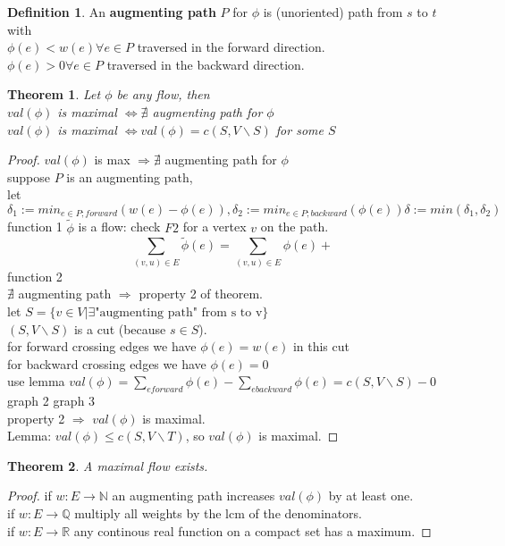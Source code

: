\documentclass{article}
\newtheorem*{theorem}{Theorem}
\theoremstyle{definition}
\newtheorem*{definition}{Definition}
\theoremstyle{remark}
\begin{document}
\begin{definition}
  An \textbf{augmenting path} $P$ for $\phi$ is (unoriented) path from $s$ to $t$ with \\
  $\phi(e) < w(e) \forall e \in P$ traversed in the forward direction.\\
  $\phi(e) > 0 \forall e \in P$ traversed in the backward direction. 
\end{definition}
\begin{theorem}
  Let $\phi$ be any flow, then\\
   $val(\phi)$ is maximal $\Longleftrightarrow \nexists $ augmenting path for $\phi$\\
   $val(\phi)$ is maximal $\Longleftrightarrow val(\phi) = c(S, V\backslash S)$ for some $S$
\end{theorem}
\begin{proof}
  $val(\phi)$ is max $\Rightarrow \nexists $ augmenting path for $\phi$\\
  suppose $P$ is an augmenting path,\\ let $\delta_1 := min_{e\in P;forward}(w(e)-\phi(e)), \delta_2:= min_{e\in P;backward}(\phi(e)) \delta:= min(\delta_1, \delta_2)$
  function 1
  $\widetilde{\phi}$ is a flow: check $F2$ for a vertex $v$ on the path.
  $$\sum_{(v,u) \in E} \widetilde{\phi}(e) = \sum_{(v,u) \in E} \phi(e) + $$ function 2\\
  $\nexists$ augmenting path $\Rightarrow$ property 2 of theorem.\\
  let $S=\{v \in V | \exists \text{"augmenting path" from s to v} \}$\\
  $(S, V\backslash S)$ is a cut (because $s\in S$).\\
  for forward crossing edges we have $\phi(e)=w(e)$ in this cut\\
  for backward crossing edges we have $\phi(e)=0$\\
  use lemma $val(\phi)= \sum_{e forward}\phi(e)-\sum_{e backward}\phi(e)=c(S, V\backslash S)-0$\\
  graph 2
  graph 3\\
  property 2 $\Rightarrow$ $val(\phi)$ is maximal.\\
  Lemma: $val(\phi) \leq c(S, V\backslash T)$, so $val(\phi)$ is maximal.
\end{proof}
\begin{theorem}
  A maximal flow exists.
\end{theorem}
\begin{proof}
  if $w:E\rightarrow \mathbb{N}$ an augmenting path increases $val(\phi)$ by at least one.\\
  if $w:E\rightarrow \mathbb{Q}$ multiply all weights by the lcm of the denominators.\\
  if $w:E\rightarrow \mathbb{R}$ any continous real function on a compact set has a maximum.
\end{proof}
\end{document}
